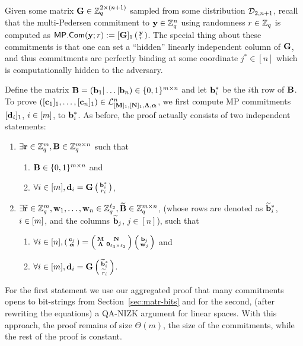 Given some matrix $\mathbf{{G}} \in \mathbb{Z}_q^{2 \times (n+1)}$ sampled from some distribution $\mathcal{D}_{2,n+1}$, recall that the multi-Pedersen commitment to $\mathbf{y}\in\mathbb{Z}_q^n$ using randomness $r\in\mathbb{Z}_q$ is computed as $\mathsf{MP}.\mathsf{Com}(\mathbf{y};r):=[\mathbf{{G}}]_1 \left(\begin{smallmatrix}\mathbf{y} \\ r\end{smallmatrix}\right)$. The special thing about these commitments is that one can set a ``hidden'' linearly independent column of $\mathbf{{G}}$, and thus commitments are perfectly binding at some coordinate $j^*\in[n]$ which is computationally hidden to the adversary.

Define the matrix $\mathbf{{B}}=(\mathbf{b}_1| \ldots | \mathbf{b}_n) \in \{0,1\}^{{m} \times n}$ and let $\mathbf{b}_i^*$ be the $i$th row of $\mathbf{{B}}$. To prove $([\mathbf{c}_1]_1,\ldots, [\mathbf{c}_n]_1) \in\mathcal{L}_{[\mathbf{{M}}]_1,[\mathbf{{N}}]_1,\mathbf{{\Lambda}},{\boldsymbol \alpha}}^n$, we first compute MP commitments $[\mathbf{d}_i]_1$, $i \in [{m}]$, to $\mathbf{b}_i^*$.  As before, 
the proof actually consists of two independent statements:
\begin{enumerate}
\item $\exists \mathbf{r} \in \mathbb{Z}_q^{m}, \mathbf{{B}} \in \mathbb{Z}_q^{{m} \times n}$ such that  
    \begin{enumerate}
    \item $\mathbf{{B}} \in \{0,1\}^{{m} \times n}$ and
    \item $\forall i \in [m], \mathbf{d}_i=\mathbf{{G}}\left(\begin{smallmatrix}\mathbf{b}_i^*  \\ r_i\end{smallmatrix}\right)$,
    \end{enumerate}
\item $\exists \widetilde{\mathbf{r}}\in\mathbb{Z}_q^{m}, \mathbf{w}_1,\ldots,\mathbf{w}_n \in\mathbb{Z}_q^{\ell_2}, \widetilde{\mathbf{{B}}} \in \mathbb{Z}_q^{{m} \times n}$, (whose rows are denoted as $\widetilde{\mathbf{b}}_i^*$, $i \in [{m}]$, and the columns $\widetilde{\mathbf{b}}_j$, $j \in [n]$), such that  
   \begin{enumerate}
   \item $\forall i\in[n], \left(\begin{smallmatrix}
    \mathbf{c}_j\\
    {\boldsymbol \alpha}
\end{smallmatrix}\right)
=
\left(\begin{smallmatrix}
    \mathbf{{M}}       & \mathbf{{N}}\\
    \mathbf{{\Lambda}} & \mathbf{{0}}_{{\ell_3}\times {\ell_2}}
\end{smallmatrix}\right)
\left(\begin{smallmatrix}
    \mathbf{b}_j\\
    \mathbf{w}_j
\end{smallmatrix}\right)$ and 
    \item $\forall i \in [{m}], \mathbf{d}_i=\mathbf{{G}}   \left(\begin{smallmatrix}\widetilde{\mathbf{b}}^*_i  \\ \widetilde{r}_i\end{smallmatrix}\right)$.
    \end{enumerate}
\end{enumerate}
For the first statement we use our aggregated proof that many commitments opens to bit-strings from Section~\ref{sec:matr-bits} and for the second, (after rewriting the equations) a QA-NIZK argument for linear spaces. With this approach, the proof remains of size $\Theta(m)$, the size of the commitments, while the rest of the proof is constant. 

